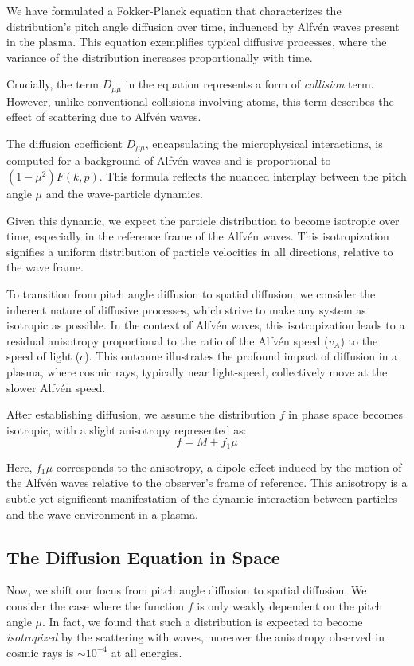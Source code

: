 We have formulated a Fokker-Planck equation that characterizes the distribution's pitch angle diffusion over time, influenced by Alfvén waves present in the plasma. This equation exemplifies typical diffusive processes, where the variance of the distribution increases proportionally with time.

Crucially, the term \( D_{\mu\mu} \) in the equation represents a form of \emph{collision} term. However, unlike conventional collisions involving atoms, this term describes the effect of scattering due to Alfvén waves. 

The diffusion coefficient \( D_{\mu\mu} \), encapsulating the microphysical interactions, is computed for a background of Alfvén waves and is proportional to \( (1-\mu^2) F(k, p) \). This formula reflects the nuanced interplay between the pitch angle \( \mu \) and the wave-particle dynamics.

Given this dynamic, we expect the particle distribution to become isotropic over time, especially in the reference frame of the Alfvén waves. This isotropization signifies a uniform distribution of particle velocities in all directions, relative to the wave frame.

To transition from pitch angle diffusion to spatial diffusion, we consider the inherent nature of diffusive processes, which strive to make any system as isotropic as possible. In the context of Alfvén waves, this isotropization leads to a residual anisotropy proportional to the ratio of the Alfvén speed (\( v_A \)) to the speed of light (\( c \)). This outcome illustrates the profound impact of diffusion in a plasma, where cosmic rays, typically near light-speed, collectively move at the slower Alfvén speed.

After establishing diffusion, we assume the distribution \( f \) in phase space becomes isotropic, with a slight anisotropy represented as:
%
\[
f = M + f_1 \mu
\]

Here, \( f_1 \mu \) corresponds to the anisotropy, a dipole effect induced by the motion of the Alfvén waves relative to the observer's frame of reference. This anisotropy is a subtle yet significant manifestation of the dynamic interaction between particles and the wave environment in a plasma.

\subsection{The Diffusion Equation in Space}

Now, we shift our focus from pitch angle diffusion to spatial diffusion. We consider the case where the function \( f \) is only weakly dependent on the pitch angle \(\mu\). In fact, we found that such a distribution is expected to become \emph{isotropized} by the scattering with waves, moreover the anisotropy observed in cosmic rays is \( \sim 10^{-4} \) at all energies.

